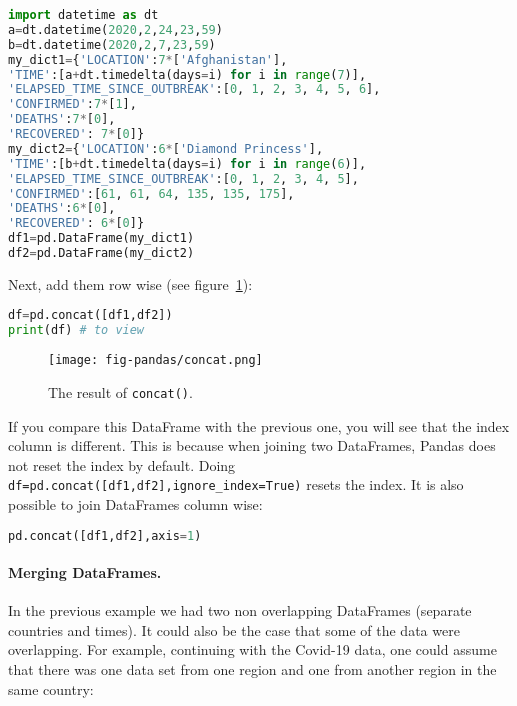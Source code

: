 \documentclass[graybox,sectrefs,envcountresetchap,open=right,final]{svmonodo}
\begin{document}
\begin{lstlisting}[language=python,style=blue1bar]
import datetime as dt
a=dt.datetime(2020,2,24,23,59)
b=dt.datetime(2020,2,7,23,59)
my_dict1={'LOCATION':7*['Afghanistan'], 
'TIME':[a+dt.timedelta(days=i) for i in range(7)],
'ELAPSED_TIME_SINCE_OUTBREAK':[0, 1, 2, 3, 4, 5, 6],
'CONFIRMED':7*[1],
'DEATHS':7*[0],
'RECOVERED': 7*[0]}
my_dict2={'LOCATION':6*['Diamond Princess'], 
'TIME':[b+dt.timedelta(days=i) for i in range(6)],
'ELAPSED_TIME_SINCE_OUTBREAK':[0, 1, 2, 3, 4, 5],
'CONFIRMED':[61, 61, 64, 135, 135, 175],
'DEATHS':6*[0],
'RECOVERED': 6*[0]}
df1=pd.DataFrame(my_dict1)
df2=pd.DataFrame(my_dict2)

\end{lstlisting}

Next, add them row wise (see figure~\ref{fig:pandas:concat}):




\begin{lstlisting}[language=python,style=blue1bar]
df=pd.concat([df1,df2])
print(df) # to view

\end{lstlisting}


\begin{figure}[!ht]  %
  \centerline{\texttt{[image: fig-pandas/concat.png]}}
  \caption{
  The result of \texttt{concat()}. \label{fig:pandas:concat}
  }
\end{figure}

If you compare this DataFrame with the previous one, you will see that the index column is different. This is because when joining two DataFrames, Pandas does not reset the index by default. Doing \Verb!df=pd.concat([df1,df2],ignore_index=True)! resets the index. It is also possible to join DataFrames column wise:


\begin{lstlisting}[language=python,style=blue1bar]
pd.concat([df1,df2],axis=1)

\end{lstlisting}


\paragraph{Merging DataFrames.}
In the previous example we had two non overlapping DataFrames (separate countries and times). It could also be the case that some of the data were overlapping. For example, continuing with the Covid-19 data, one could assume that there was one data set from one region and one from another region in the same country:
\end{document}
